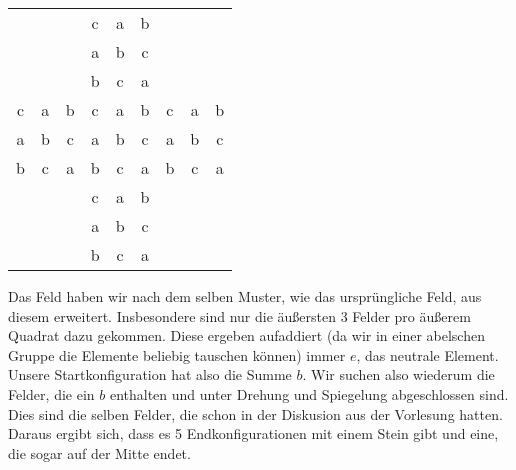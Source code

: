 \documentclass[11pt,a4paper,ngerman]{article}
\begin{document}
\begin{enumerate}[\bfseries (a)]
\begin{center}
\begin{tabular}{|ccc|ccc|ccc|}
\hline
&&&c&a&b&&&\\
&&&a&b&c&&&\\
&&&b&c&a&&&\\
\hline
c&a&b&c&a&b&c&a&b\\
a&b&c&a&b&c&a&b&c\\
b&c&a&b&c&a&b&c&a\\
\hline
&&&c&a&b&&&\\
&&&a&b&c&&&\\
&&&b&c&a&&&\\
\hline
\end{tabular}
\end{center}

Das Feld haben wir nach dem selben Muster, wie das ursprüngliche Feld, aus diesem erweitert. Insbesondere sind nur die äußersten 3 Felder pro äußerem Quadrat dazu gekommen. Diese ergeben aufaddiert (da wir in einer abelschen Gruppe die Elemente beliebig tauschen können) immer $e$, das neutrale Element.\\

Unsere Startkonfiguration hat also die Summe $b$. Wir suchen also wiederum die Felder, die ein $b$ enthalten und unter Drehung und Spiegelung abgeschlossen sind.\\

Dies sind die selben Felder, die schon in der Diskusion aus der Vorlesung hatten. Daraus ergibt sich, dass es 5 Endkonfigurationen mit einem Stein gibt und eine, die sogar auf der Mitte endet.

\end{enumerate}

\label{LastPage}
\end{document}
